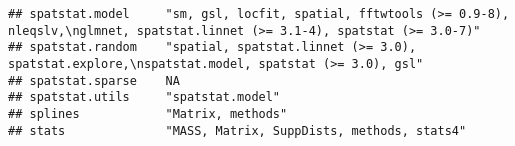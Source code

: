 \documentclass[
]{article}
\begin{document}
\begin{verbatim}
## spatstat.model     "sm, gsl, locfit, spatial, fftwtools (>= 0.9-8), nleqslv,\nglmnet, spatstat.linnet (>= 3.1-4), spatstat (>= 3.0-7)"                                                                                                                                                                                                                                                                                                                                                               
## spatstat.random    "spatial, spatstat.linnet (>= 3.0), spatstat.explore,\nspatstat.model, spatstat (>= 3.0), gsl"                                                                                                                                                                                                                                                                                                                                                                                    
## spatstat.sparse    NA                                                                                                                                                                                                                                                                                                                                                                                                                                                                                
## spatstat.utils     "spatstat.model"                                                                                                                                                                                                                                                                                                                                                                                                                                                                  
## splines            "Matrix, methods"                                                                                                                                                                                                                                                                                                                                                                                                                                                                 
## stats              "MASS, Matrix, SuppDists, methods, stats4"                                                                                                                                                                                                                                                                                                                                                                                                                                        

\end{verbatim}
\end{document}
